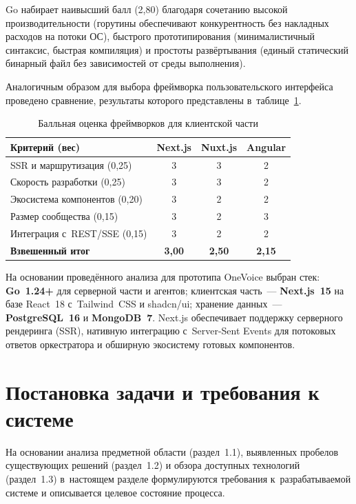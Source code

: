Go набирает наивысший балл (2{,}80) благодаря сочетанию высокой производительности (горутины обеспечивают конкурентность без накладных расходов на потоки ОС), быстрого прототипирования (минималистичный синтаксис, быстрая компиляция) и простоты развёртывания (единый статический бинарный файл без зависимостей от среды выполнения).

Аналогичным образом для выбора фреймворка пользовательского интерфейса проведено сравнение, результаты которого представлены в~таблице~\ref{tab:frontend-compare}.

\begin{table}[H]
  \caption{Балльная оценка фреймворков для клиентской части}
  \label{tab:frontend-compare}
  \small
  \begin{tabularx}{\textwidth}{|X|c|c|c|}
    \hline
    \textbf{Критерий (вес)} & \textbf{Next.js} & \textbf{Nuxt.js} & \textbf{Angular} \\
    \hline
    SSR и маршрутизация (0{,}25) & 3 & 3 & 2 \\
    \hline
    Скорость разработки (0{,}25) & 3 & 3 & 2 \\
    \hline
    Экосистема компонентов (0{,}20) & 3 & 2 & 2 \\
    \hline
    Размер сообщества (0{,}15) & 3 & 2 & 3 \\
    \hline
    Интеграция с~REST/SSE (0{,}15) & 3 & 2 & 2 \\
    \hline
    \textbf{Взвешенный итог} & \textbf{3{,}00} & \textbf{2{,}50} & \textbf{2{,}15} \\
    \hline
  \end{tabularx}
\end{table}

На основании проведённого анализа для прототипа OneVoice выбран стек: \textbf{Go~1.24+} для серверной части и агентов; клиентская часть~--- \textbf{Next.js~15} на базе React~18 с~Tailwind~CSS и shadcn/ui; хранение данных~--- \textbf{PostgreSQL~16} и \textbf{MongoDB~7}. Next.js обеспечивает поддержку серверного рендеринга (SSR), нативную интеграцию с~Server-Sent Events для потоковых ответов оркестратора и обширную экосистему готовых компонентов.


\section{Постановка задачи и требования к системе}
\label{sec:ch1-requirements}

На основании анализа предметной области (раздел~1.1), выявленных пробелов существующих решений (раздел~1.2) и обзора доступных технологий (раздел~1.3) в~настоящем разделе формулируются требования к~разрабатываемой системе и описывается целевое состояние процесса.

